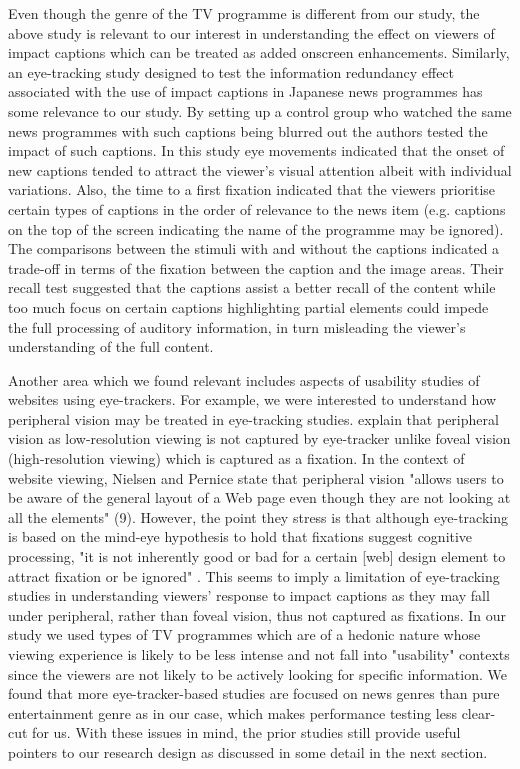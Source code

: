 \documentclass[output=paper]{langsci/langscibook}
\begin{document}
Even though the genre of the TV programme is different from our study, the above study is relevant to our interest in understanding the effect on viewers of impact captions which can be treated as added onscreen enhancements. Similarly, an eye-tracking study \citep{Matsukawa2009} designed to test the information redundancy effect associated with the use of impact captions in Japanese news programmes has some relevance to our study.  By setting up a control group who watched the same news programmes with such captions being blurred out the authors tested the impact of such captions.  In this study eye movements indicated that the onset of new captions tended to attract the viewer's visual attention albeit with individual variations. Also, the time to a first fixation indicated that the viewers prioritise certain types of captions in the order of relevance to the news item (e.g. captions on the top of the screen indicating the name of the programme may be ignored). The comparisons between the stimuli with and without the captions indicated a trade-off in terms of the fixation between the caption and the image areas. Their recall test suggested that the captions assist a better recall of the content while too much focus on certain captions highlighting partial elements could impede the full processing of auditory information, in turn misleading the viewer's understanding of the full content.       



Another area which we found relevant includes aspects of usability studies of websites using eye-trackers. For example, we were interested to understand how peripheral vision may be treated in eye-tracking studies.  \citet[pp. 6--7]{Nielsen2010} explain that peripheral vision as low-resolution viewing is not captured by eye-tracker unlike foveal vision (high-resolution viewing) which is captured as a fixation.  In the context of website viewing, Nielsen and Pernice state that peripheral vision "allows users to be aware of the general layout of a Web page even though they are not looking at all the elements" (9). However, the point they stress is that although eye-tracking is based on the mind-eye hypothesis to hold that fixations suggest cognitive processing, "it is not inherently good or bad for a certain [web] design element to attract fixation or be ignored" \citep[pg. 10]{Nielsen2010}.  This seems to imply a limitation of eye-tracking studies in understanding viewers' response to impact captions as they may fall under peripheral, rather than foveal vision, thus not captured as fixations. In our study we used types of TV programmes which are of a hedonic nature whose viewing experience is likely to be less intense and not fall into "usability" contexts since the viewers are not likely to be actively looking for specific information.  We found that more eye-tracker-based studies are focused on news genres than pure entertainment genre as in our case, which makes performance testing less clear-cut for us.  With these issues in mind, the prior studies still provide useful pointers to our research design as discussed in some detail in the next section. 
\end{document}
